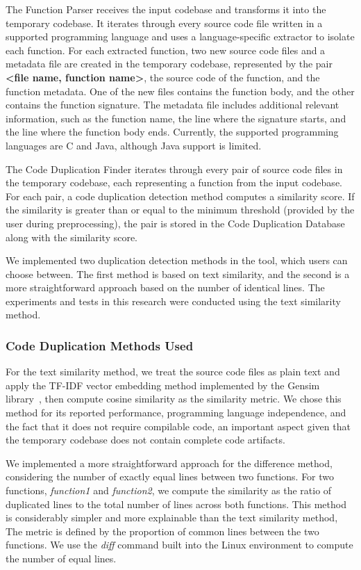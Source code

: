 \documentclass[conference]{IEEEtran}
\begin{document}
The Function Parser receives the input codebase and transforms it into the temporary
codebase. It iterates through every source code file written in a supported programming 
language and uses a language-specific extractor to isolate each function. For each extracted 
function, two new source code files and a metadata file are created in the temporary codebase, 
represented by the pair \textbf{<file name, function name>}, the source code of the function, 
and the function metadata. One of the new files contains the function body, and the other 
contains the function signature. The metadata file includes additional relevant information,
such as the function name, the line where the signature starts, and the line where the function 
body ends. Currently, the supported programming languages are C and Java, although Java support is limited.

The Code Duplication Finder iterates through every pair of source code files in the
temporary codebase, each representing a function from the input codebase. For each pair,
a code duplication detection method computes a similarity score. If the similarity is greater 
than or equal to the minimum threshold (provided by the user during preprocessing), the pair 
is stored in the Code Duplication Database along with the similarity score.

We implemented two duplication detection methods in the tool, which users can choose 
between. The first method is based on text similarity, and the second is a more straightforward approach 
based on the number of identical lines. The experiments and tests in this research were 
conducted using the text similarity method.


\subsubsection{Code Duplication Methods Used}

For the text similarity method, we treat the source code files as plain text and apply the
TF-IDF vector embedding method implemented by the Gensim library~\cite{gensim},
then compute cosine similarity as the similarity metric. We chose this method for 
its reported performance, programming language independence, and the fact that it does 
not require compilable code, an important aspect given that the
temporary codebase does not contain complete code artifacts.

We implemented a more straightforward approach for the difference method,
considering the number of exactly equal lines between two functions.
For two functions, \textit{function1} and \textit{function2}, we compute the similarity as the 
ratio of duplicated lines to the total number of lines across both functions.
This method is considerably simpler and more explainable than the text similarity method, 
The metric is defined by the proportion of common lines between the two functions. 
We use the \textit{diff} command built into the Linux environment to compute the number of equal lines.
\end{document}
